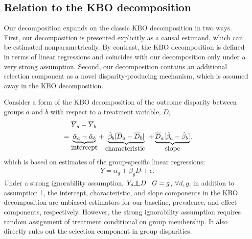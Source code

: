\documentclass[12pt,a4paper]{article}
\newcommand{\indep}{\rotatebox[origin=c]{90}{$\models$}}  %
\begin{document}
\subsection{Relation to the KBO decomposition}
Our decomposition expands on the classic KBO decomposition in two ways. First, our decomposition is presented explicitly as a causal estimand, which can be estimated nonparametrically. 
By contrast, the KBO decomposition is defined in terms of linear regressions and coincides with our decomposition only under a very strong assumption. Second, our decomposition contains an additional selection component as a novel disparity-producing mechanism, which is assumed away in the KBO decomposition. 

Consider a form of the KBO decomposition of the outcome disparity between groups $a$ and $b$ with respect to a treatment variable, $D$, 
\begin{align*}
&\phantom{{}={}} \overline{Y}_a-\overline{Y}_b   \nonumber  \\
&= \underbrace{ \hat{\alpha}_a-\hat{\alpha}_b }_{\text{\normalsize intercept}}
+ \underbrace{\hat{\beta}_b [\overline{D}_a-\overline{D}_b]}_{\text{\normalsize characteristic }}
+ \underbrace{\overline{D}_a[ \hat{\beta}_a - \hat{\beta}_b ]}_{\text{\normalsize slope}},
\end{align*}
which is based on estimates of the group-specific linear regressions:
\begin{gather*}
Y=\alpha_g+\beta_g D + \epsilon.
\end{gather*}
Under a strong ignorability assumption, $Y_d \indep D \mid  G=g$, $\forall d, g$, in addition to assumption 1, the intercept, characteristic, and slope components in the KBO decomposition are unbiased estimators for our baseline, prevalence, and effect components, respectively. However, the strong ignorability assumption requires random assignment of treatment conditional on group membership. It also directly rules out the selection component in group disparities.
\end{document}
